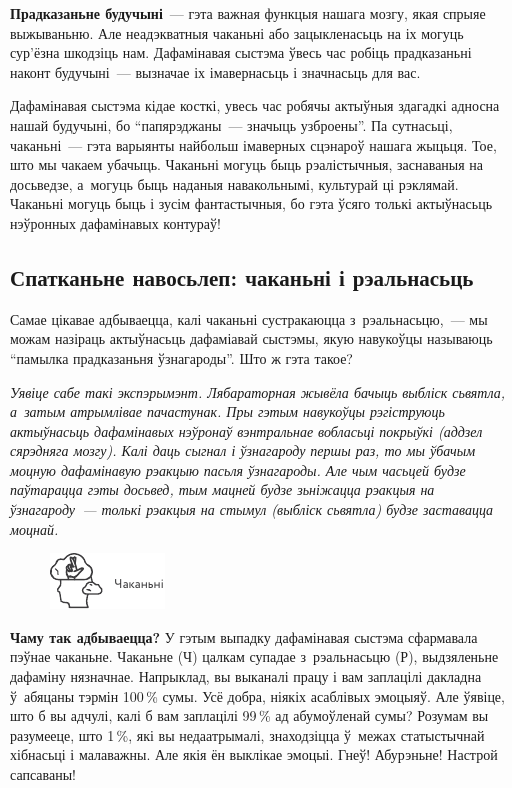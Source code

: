 \textbf{Прадказаньне будучыні}~--- гэта важная функцыя нашага мозгу, якая спрыяе выжываньню. Але неадэкватныя чаканьні або зацыкленасьць на іх могуць сур'ёзна шкодзіць нам. Дафамінавая сыстэма ўвесь час робіць прадказаньні наконт будучыні~--- вызначае іх імавернасьць і значнасьць для вас.


Дафамінавая сыстэма кідае косткі, увесь час робячы актыўныя здагадкі адносна нашай будучыні, бо ``папярэджаны~--- значыць узброены''. Па сутнасьці, чаканьні~--- гэта варыянты найбольш імаверных сцэнароў нашага жыцьця. Тое, што мы чакаем убачыць. Чаканьні могуць быць рэалістычныя, заснаваныя на досьведзе, а~могуць быць наданыя навакольнымі, культурай ці рэклямай. Чаканьні могуць быць і зусім фантастычныя, бо гэта ўсяго толькі актыўнасьць нэўронных дафамінавых контураў!

\subsection*{Спатканьне навосьлеп: чаканьні і рэальнасьць}

Самае цікавае адбываецца, калі чаканьні сустракаюцца з~рэальнасьцю,~--- мы можам назіраць актыўнасьць дафаміавай сыстэмы, якую навукоўцы называюць ``памылка прадказаньня ўзнагароды''. Што ж гэта такое?

\emph{Уявіце сабе такі экспэрымэнт. Лябараторная жывёла бачыць выбліск сьвятла, а~затым атрымлівае пачастунак. Пры гэтым навукоўцы рэгіструюць актыўнасьць дафамінавых нэўронаў вэнтральнае вобласьці покрыўкі (аддзел сярэдняга мозгу). Калі даць сыгнал і ўзнагароду першы раз, то мы ўбачым моцную дафамінавую рэакцыю пасьля ўзнагароды. Але чым часьцей будзе паўтарацца гэты досьвед, тым мацней будзе зьніжацца рэакцыя на ўзнагароду~--- толькі рэакцыя на стымул (выбліск сьвятла) будзе заставацца моцнай.}

\begin{figure}[htb!]
  \centering
  \includegraphics[scale=1.5]{willpower/ch8/14.pdf}
\end{figure}

\textbf{Чаму так адбываецца?} У гэтым выпадку дафамінавая сыстэма сфармавала пэўнае чаканьне. Чаканьне (Ч) цалкам супадае з~рэальнасьцю (Р), выдзяленьне дафаміну нязначнае. Напрыклад, вы выканалі працу і вам заплацілі дакладна ў~абяцаны тэрмін 100\,\% сумы. Усё добра, ніякіх асаблівых эмоцыяў. Але ўявіце, што б вы адчулі, калі б вам заплацілі 99\,\% ад абумоўленай сумы? Розумам вы разумееце, што 1\,\%, які вы недаатрымалі, знаходзіцца ў~межах статыстычнай хібнасьці і малаважны. Але якія ён выклікае эмоцыі. Гнеў! Абурэньне! Настрой сапсаваны!

